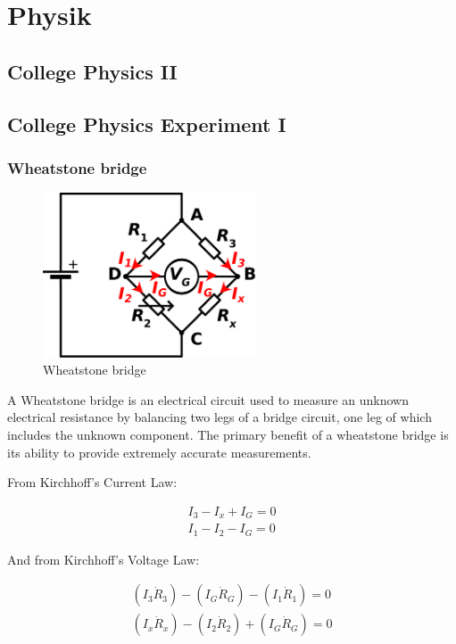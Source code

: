 \section{Physik}
\subsection{College Physics II}
\subsection{College Physics Experiment I}

\subsubsection{Wheatstone bridge}

\begin{figure}
  \centering
  \includegraphics[width=2.5in]{fig/1280px-Wheatstonebridge_current.svg.png}
  \caption{Wheatstone bridge}\label{fig_wheatstonebridge}
\end{figure}

A Wheatstone bridge is an electrical circuit used to measure an unknown electrical resistance by balancing two legs of a bridge circuit, one leg of which includes the unknown component. The primary benefit of a wheatstone bridge is its ability to provide extremely accurate measurements.

From Kirchhoff's Current Law:

\begin{multline*}
  I_3-I_x+I_G=0 \\
  I_1-I_2-I_G=0
\end{multline*}

And from Kirchhoff's Voltage Law:

\begin{multline*}
  (I_3\dot R_3)-(I_G\dot R_G)-(I_1\dot R_1)=0 \\
  (I_x\dot R_x)-(I_2\dot R_2)+(I_G\dot R_G)=0
\end{multline*}

